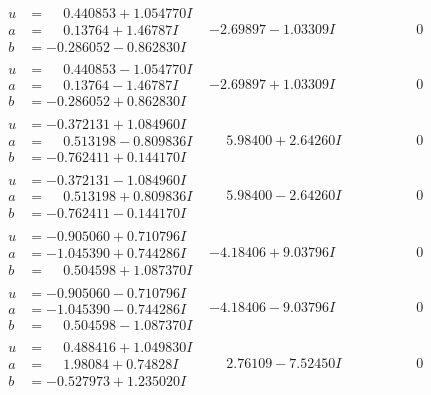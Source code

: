 \documentclass[1p]{elsarticle_modified}
\theoremstyle{definition}
\begin{document}
$$\begin{array}{c|c|c}
\begin{aligned}
u &= \phantom{-}0.440853 + 1.054770 I \\
a &= \phantom{-}0.13764 + 1.46787 I \\
b &= -0.286052 - 0.862830 I\end{aligned}
 & -2.69897 - 1.03309 I & \phantom{-0.000000 } 0 \\ \hline\begin{aligned}
u &= \phantom{-}0.440853 - 1.054770 I \\
a &= \phantom{-}0.13764 - 1.46787 I \\
b &= -0.286052 + 0.862830 I\end{aligned}
 & -2.69897 + 1.03309 I & \phantom{-0.000000 } 0 \\ \hline\begin{aligned}
u &= -0.372131 + 1.084960 I \\
a &= \phantom{-}0.513198 - 0.809836 I \\
b &= -0.762411 + 0.144170 I\end{aligned}
 & \phantom{-}5.98400 + 2.64260 I & \phantom{-0.000000 } 0 \\ \hline\begin{aligned}
u &= -0.372131 - 1.084960 I \\
a &= \phantom{-}0.513198 + 0.809836 I \\
b &= -0.762411 - 0.144170 I\end{aligned}
 & \phantom{-}5.98400 - 2.64260 I & \phantom{-0.000000 } 0 \\ \hline\begin{aligned}
u &= -0.905060 + 0.710796 I \\
a &= -1.045390 + 0.744286 I \\
b &= \phantom{-}0.504598 + 1.087370 I\end{aligned}
 & -4.18406 + 9.03796 I & \phantom{-0.000000 } 0 \\ \hline\begin{aligned}
u &= -0.905060 - 0.710796 I \\
a &= -1.045390 - 0.744286 I \\
b &= \phantom{-}0.504598 - 1.087370 I\end{aligned}
 & -4.18406 - 9.03796 I & \phantom{-0.000000 } 0 \\ \hline\begin{aligned}
u &= \phantom{-}0.488416 + 1.049830 I \\
a &= \phantom{-}1.98084 + 0.74828 I \\
b &= -0.527973 + 1.235020 I\end{aligned}
 & \phantom{-}2.76109 - 7.52450 I & \phantom{-0.000000 } 0 \\ \hline\begin{aligned}

\end{aligned}
\end{array}$$
\end{document}
